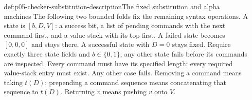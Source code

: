\begin{hbdefinition}{def:p05-checker-substitution-description}{The fixed substitution and alpha machines}
The following two bounded folds fix the remaining syntax operations.  A state
is \([b,D,V]\): a success bit, a list of pending commands with the next
command first, and a value stack with its top first.  A failed state becomes
\([0,0,0]\) and stays there.  A successful state with \(D=0\) stays fixed.
Require exactly three state fields and \(b\in\{0,1\}\); any other state
fails before its commands are inspected.
Every command must have its specified length; every required value-stack entry
must exist.  Any other case fails.  Removing a command means taking \(t(D)\);
prepending a command sequence means concatenating that sequence to \(t(D)\).
Returning \(v\) means pushing \(v\) onto \(V\).


\end{hbdefinition}
